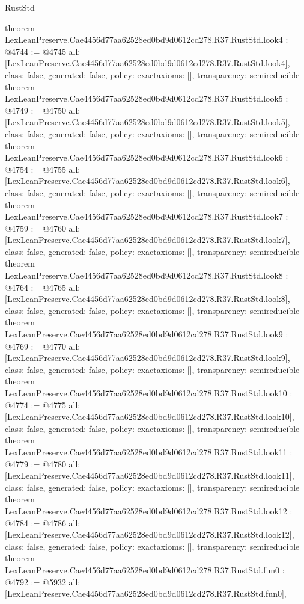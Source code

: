 \begin{lexlean}{RustStd}
\begin{coremodule}
theorem LexLeanPreserve.Cae4456d77aa62528ed0bd9d0612cd278.R37.RustStd.look4 : @4744 := @4745 {
  all: [LexLeanPreserve.Cae4456d77aa62528ed0bd9d0612cd278.R37.RustStd.look4],
  class: false,
  generated: false,
  policy: exact{axioms: []},
  transparency: semireducible
}
theorem LexLeanPreserve.Cae4456d77aa62528ed0bd9d0612cd278.R37.RustStd.look5 : @4749 := @4750 {
  all: [LexLeanPreserve.Cae4456d77aa62528ed0bd9d0612cd278.R37.RustStd.look5],
  class: false,
  generated: false,
  policy: exact{axioms: []},
  transparency: semireducible
}
theorem LexLeanPreserve.Cae4456d77aa62528ed0bd9d0612cd278.R37.RustStd.look6 : @4754 := @4755 {
  all: [LexLeanPreserve.Cae4456d77aa62528ed0bd9d0612cd278.R37.RustStd.look6],
  class: false,
  generated: false,
  policy: exact{axioms: []},
  transparency: semireducible
}
theorem LexLeanPreserve.Cae4456d77aa62528ed0bd9d0612cd278.R37.RustStd.look7 : @4759 := @4760 {
  all: [LexLeanPreserve.Cae4456d77aa62528ed0bd9d0612cd278.R37.RustStd.look7],
  class: false,
  generated: false,
  policy: exact{axioms: []},
  transparency: semireducible
}
theorem LexLeanPreserve.Cae4456d77aa62528ed0bd9d0612cd278.R37.RustStd.look8 : @4764 := @4765 {
  all: [LexLeanPreserve.Cae4456d77aa62528ed0bd9d0612cd278.R37.RustStd.look8],
  class: false,
  generated: false,
  policy: exact{axioms: []},
  transparency: semireducible
}
theorem LexLeanPreserve.Cae4456d77aa62528ed0bd9d0612cd278.R37.RustStd.look9 : @4769 := @4770 {
  all: [LexLeanPreserve.Cae4456d77aa62528ed0bd9d0612cd278.R37.RustStd.look9],
  class: false,
  generated: false,
  policy: exact{axioms: []},
  transparency: semireducible
}
theorem LexLeanPreserve.Cae4456d77aa62528ed0bd9d0612cd278.R37.RustStd.look10 : @4774 := @4775 {
  all: [LexLeanPreserve.Cae4456d77aa62528ed0bd9d0612cd278.R37.RustStd.look10],
  class: false,
  generated: false,
  policy: exact{axioms: []},
  transparency: semireducible
}
theorem LexLeanPreserve.Cae4456d77aa62528ed0bd9d0612cd278.R37.RustStd.look11 : @4779 := @4780 {
  all: [LexLeanPreserve.Cae4456d77aa62528ed0bd9d0612cd278.R37.RustStd.look11],
  class: false,
  generated: false,
  policy: exact{axioms: []},
  transparency: semireducible
}
theorem LexLeanPreserve.Cae4456d77aa62528ed0bd9d0612cd278.R37.RustStd.look12 : @4784 := @4786 {
  all: [LexLeanPreserve.Cae4456d77aa62528ed0bd9d0612cd278.R37.RustStd.look12],
  class: false,
  generated: false,
  policy: exact{axioms: []},
  transparency: semireducible
}
theorem LexLeanPreserve.Cae4456d77aa62528ed0bd9d0612cd278.R37.RustStd.fun0 : @4792 := @5932 {
  all: [LexLeanPreserve.Cae4456d77aa62528ed0bd9d0612cd278.R37.RustStd.fun0],
}
\end{coremodule}
\end{lexlean}
